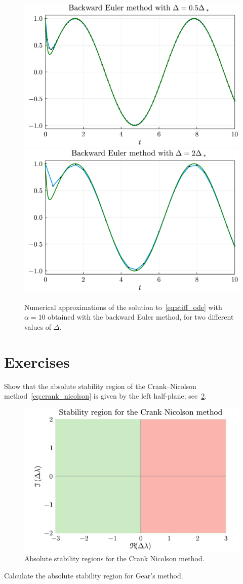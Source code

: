 \begin{figure}[ht]
    \centering
    \includegraphics[width=0.48\linewidth]{figures/stiff_backward_euler_0_5.pdf}
    \includegraphics[width=0.48\linewidth]{figures/stiff_backward_euler_2_0.pdf}
    \caption{%
        Numerical approximations of the solution to~\eqref{eq:stiff_ode} with $\alpha = 10$ obtained with the backward Euler method,
        for two different values of $\Delta$.
    }%
    \label{fig:backward_euler_stiff}
\end{figure}
\section{Exercises}

\begin{exercise}
    Show that the absolute stability region of the Crank--Nicolson method~\eqref{eq:crank_nicolson} is given by the left half-plane;
    see~\cref{fig:stab_region_crank_nicolson}.
\end{exercise}

\begin{figure}[ht]
    \centering
    \includegraphics[width=0.7\linewidth]{figures/stability_Crank-Nicolson.pdf}
    \caption{Absolute stability regions for the Crank Nicolson method.}%
    \label{fig:stab_region_crank_nicolson}
\end{figure}

\begin{exercise}
    Calculate the absolute stability region for Gear's method.
\end{exercise}
